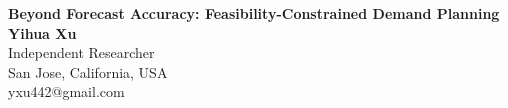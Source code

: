\documentclass[10pt,letterpaper]{article}
\begin{document}
\begin{center}
{\Large\textbf{Beyond Forecast Accuracy: Feasibility-Constrained Demand Planning}}\\[6pt]
\textbf{Yihua Xu}\\
Independent Researcher\\
San Jose, California, USA\\
yxu442@gmail.com
\end{center}










\end{document}
